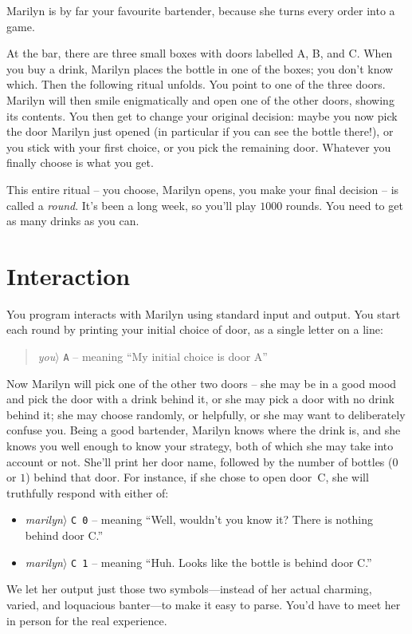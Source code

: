 


Marilyn is by far your favourite bartender, because she turns every order into a game.

At the bar, there are three small boxes with doors labelled A, B, and C.
When you buy a drink, Marilyn places the bottle in one of the boxes; you don't know which.
Then the following ritual unfolds.
You point to one of the three doors.
Marilyn will then smile enigmatically and open one of the other doors, showing its contents.
You then get to change your original decision: maybe you now pick the door Marilyn just opened (in particular if you can see the bottle there!), or you stick with your first choice, or you pick the remaining door.
Whatever you finally choose is what you get.

This entire ritual – you choose, Marilyn opens, you make your final decision -- is called a \emph{round}.
It’s been a long week, so you’ll play $1000$ rounds.
You need to get as many drinks as you can.

\section*{Interaction}

You program interacts with Marilyn using standard input and output.
You start each round by printing your initial choice of door, as a single letter on a line:
\begin{quote}\emph{you}$\rangle$ \verb|A| -- meaning ``My initial choice is door A''\end{quote}
Now Marilyn will pick one of the other two doors -- she may be in a good mood and pick the door with a drink behind it, or she may pick a door with no drink behind it; she may choose randomly, or helpfully, or she may want to deliberately confuse you.
Being a good bartender, Marilyn knows where the drink is, and she knows you well enough to know your strategy, both of which she may take into account or not.
She'll print her door name, followed by the number of bottles ($0$ or $1$) behind that door.
For instance, if she chose to open door~C, she will truthfully respond with  either of:
\begin{itemize}
  \item
\emph{marilyn}$\rangle$ \verb|C 0| -- meaning ``Well, wouldn't you know it? There is nothing behind door C.''
\item
  \emph{marilyn}$\rangle$ \verb|C 1| -- meaning ``Huh. Looks like the bottle is behind door C.''
\end{itemize}
We let her output just those two symbols---instead of her actual charming, varied, and loquacious banter---to make it easy to parse.
You'd have to meet her in person for the real experience.

